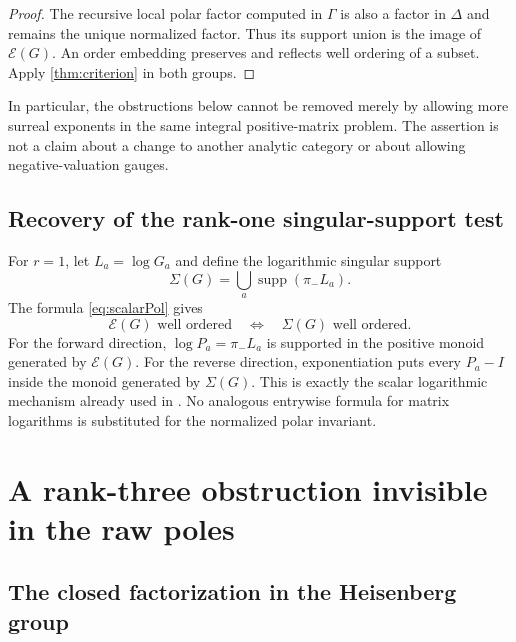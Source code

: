 \documentclass[11pt,letterpaper]{article}
\theoremstyle{definition}
\theoremstyle{remark}
\newcommand{\supp}{\operatorname{supp}}
\newcommand{\EU}{\mathcal E}
\numberwithin{equation}{section}
\begin{document}
\begin{proof}
The recursive local polar factor computed in $\Gamma$ is also a factor in $\Delta$ and remains the unique normalized factor. Thus its support union is the image of $\EU(G)$. An order embedding preserves and reflects well ordering of a subset. Apply \cref{thm:criterion} in both groups.
\end{proof}

In particular, the obstructions below cannot be removed merely by allowing more surreal exponents in the same integral positive-matrix problem. The assertion is not a claim about a change to another analytic category or about allowing negative-valuation gauges.

\subsection{Recovery of the rank-one singular-support test}

For $r=1$, let $L_a=\log G_a$ and define the logarithmic singular support
\[
 \Sigma(G)=\bigcup_a\supp(\pi_-L_a).
\]
The formula \eqref{eq:scalarPol} gives
\begin{equation}\label{eq:scalarequiv}
 \EU(G)\text{ well ordered}
 \quad\Longleftrightarrow\quad
 \Sigma(G)\text{ well ordered}.
\end{equation}
For the forward direction, $\log P_a=\pi_-L_a$ is supported in the positive monoid generated by $\EU(G)$. For the reverse direction, exponentiation puts every $P_a-I$ inside the monoid generated by $\Sigma(G)$. This is exactly the scalar logarithmic mechanism already used in \cite{RepoGlobal}. No analogous entrywise formula for matrix logarithms is substituted for the normalized polar invariant.

\section{A rank-three obstruction invisible in the raw poles}\label{sec:rankthree}

\subsection{The closed factorization in the Heisenberg group}
\end{document}
